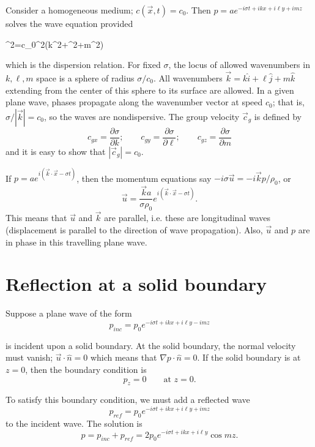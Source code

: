 Consider a homogeneous medium; $c(\vec x,t)=c_0$. Then
$p=a e^{-i\sigma t+ikx+i\ell y+imz}$ solves the wave equation provided
\begin{waveequation}
	\sigma^2=c_0^2(k^2+\ell^2+m^2)
\end{waveequation}
which is the dispersion relation. For fixed $\sigma$, the locus of allowed wavenumbers in
$k,\ell,m$ space is a sphere of radius $\sigma/c_0$. All wavenumbers
$\vec k=k\hat i+\ell\hat j+m\hat k$ extending from the center of this sphere to its
surface are allowed. In a given plane wave, phases propagate along the wavenumber
vector at speed $c_0$; that is, $\sigma/|\vec k|=c_0$, so the waves are nondispersive.
The group velocity $\vec c_g$ is defined by
\[
	c_{gx}=\frac{\partial\sigma}{\partial k};\qquad
	c_{gy}=\frac{\partial\sigma}{\partial\ell};\qquad
	c_{gz}=\frac{\partial\sigma}{\partial m}
\]
and it is easy to show that $|\vec c_g|=c_0$.

If $p=a e^{i(\vec k\cdot\vec x-\sigma t)}$, then the momentum equations say
$-i\sigma\vec u=-i\vec k p/\rho_0$, or
\[
	\vec u=\frac{\vec k a}{\sigma\rho_0}
	e^{i(\vec k\cdot\vec x-\sigma t)}.
\]
This means that $\vec u$ and $\vec k$ are parallel, i.e. these are longitudinal waves
(displacement is parallel to the direction of wave propagation). Also, $\vec u$ and $p$
are in phase in this travelling plane wave.

\section{Reflection at a solid boundary}

Suppose a plane wave of the form
\[
	p_{inc}=p_0e^{-i\sigma t+ikx+i\ell y-imz}
\]

\sourcepagebreak

is incident upon a solid boundary. At the solid boundary, the normal velocity must
vanish; $\vec u\cdot\hat n=0$ which means that $\nabla p\cdot\hat n=0$. If the solid
boundary is at $z=0$, then the boundary condition is
\[
	p_z=0\qquad\text{at }z=0.
\]


To satisfy this boundary condition, we must add a reflected wave
\[
	p_{ref}=p_0e^{-i\sigma t+ikx+i\ell y+imz}
\]
to the incident wave. The solution is
\[
	p=p_{inc}+p_{ref}=2p_0e^{-i\sigma t+ikx+i\ell y}\cos mz.
\]

